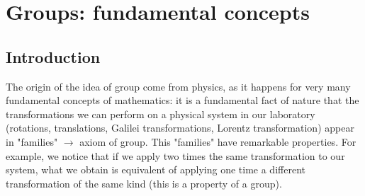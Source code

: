 \documentclass[../main.tex]{subfiles}
\begin{document}
\setchapterpreamble[u]{\margintoc}
\chapter[Groups: fundamental concepts]{Groups: fundamental concepts\footnotemark[0]}
\section{Introduction}
The origin of the idea of group come from physics, as it happens for very many fundamental concepts of mathematics: it is a fundamental fact of nature that the transformations we can perform on a physical system in our laboratory (rotations, translations, Galilei transformations, Lorentz transformation) appear in "families" $\longrightarrow$ axiom of group. This "families" have remarkable properties. For example, we notice that if we apply two times the same transformation to our system, what we obtain is equivalent of applying one time a different transformation of the same kind (this is a property of a group).
\end{document}
